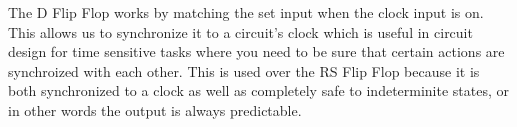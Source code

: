 \documentclass[11pt]{scrartcl}
\begin{document}
The D Flip Flop works by matching the set input when the clock input is on. This allows us to synchronize it to a circuit's clock which is
useful in circuit design for time sensitive tasks where you need to be sure that certain actions are synchroized with each other. This is
used over the RS Flip Flop because it is both synchronized to a clock as well as completely safe to indeterminite states, or in other
words the output is always predictable.
\end{document}
